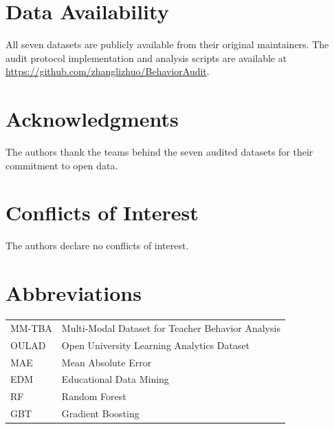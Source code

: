 \documentclass[10pt,letterpaper]{article}
\begin{document}
\section*{Data Availability}
All seven datasets are publicly available from their original maintainers. The audit
protocol implementation and analysis scripts are available at
\url{https://github.com/zhanglizhuo/BehaviorAudit}.

\section*{Acknowledgments}
The authors thank the teams behind the seven audited datasets for their commitment
to open data.

\section*{Conflicts of Interest}
The authors declare no conflicts of interest.

\section*{Abbreviations}
\noindent
\begin{tabular}{@{}ll}
MM-TBA & Multi-Modal Dataset for Teacher Behavior Analysis \\
OULAD  & Open University Learning Analytics Dataset \\
MAE    & Mean Absolute Error \\
EDM    & Educational Data Mining \\
RF     & Random Forest \\
GBT    & Gradient Boosting \\
\end{tabular}

\nolinenumbers


\end{document}
